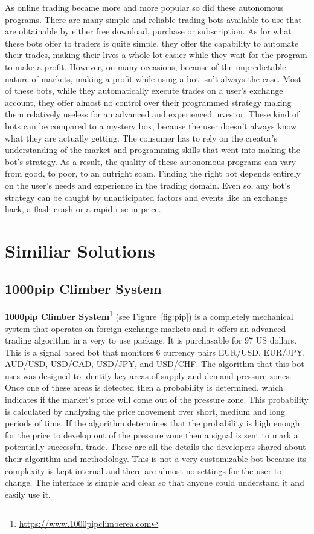 \documentclass[12pt,a4paper]{report}
\begin{document}
As online trading became more and more popular so did these autonomous programs. There are many simple and reliable trading bots available to use that are obtainable by either free download, purchase or subscription. As for what these bots offer to traders is quite simple, they offer the capability to automate their trades, making their lives a whole lot easier while they wait for the program to make a profit. However, on many occasions, because of the unpredictable nature of markets, making a profit while using a bot isn't always the case. Most of these bots, while they automatically execute trades on a user's exchange account, they offer almost no control over their programmed strategy making them relatively useless for an advanced and experienced investor. These kind of bots can be compared to a mystery box, because the user doesn't always know what they are actually getting. The consumer has to rely on the creator's understanding of the market and programming skills that went into making the bot's strategy. As a result, the quality of these autonomous programs can vary from good, to poor, to an outright scam. Finding the right bot depends entirely on the user's needs and experience in the trading domain. Even so, any bot's strategy can be caught by unanticipated factors and events like an exchange hack, a flash crash or a rapid rise in price.
     

\section{Similiar Solutions}
\subsection{1000pip Climber System}
\textbf{1000pip Climber System}\footnote{\url{https://www.1000pipclimberea.com}} (see Figure~\ref{fig:pip}) is a completely mechanical system that operates on foreign exchange markets and it offers an advanced trading algorithm in a very to use package. It is purchasable for 97 US dollars. This is a signal based bot that monitors 6 currency pairs EUR/USD, EUR/JPY, AUD/USD, USD/CAD, USD/JPY, and USD/CHF. The algorithm that this bot uses was designed to identify key areas of supply and demand pressure zones. Once one of these areas is detected then a probability is determined, which indicates if the market's price will come out of the pressure zone. This probability is calculated by analyzing the price movement over short, medium and long periods of time. If the algorithm determines that the probability is high enough for the price to develop out of the pressure zone then a signal is sent to mark a potentially successful trade. These are all the details the developers shared about their algorithm and methodology. This is not a very customizable bot because its complexity is kept internal and there are almost no settings for the user to change. The interface is simple and clear so that anyone could understand it and easily use it.    
\end{document}
